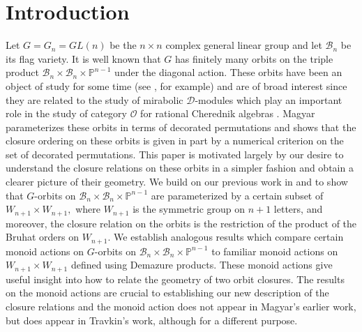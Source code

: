 \documentclass[12pt]{amsart}
\numberwithin{equation}{section}
\newcommand{\B}{\mathcal{B}}
\begin{document}
\section{Introduction}
Let $G=G_{n}=GL(n)$ be the $n\times n$ complex general linear group and let $\B_{n}$ be its flag variety.  It is well known that $G$ has finitely many orbits on the triple product 
$\B_{n}\times\B_{n}\times\mathbb{P}^{n-1}$ under the diagonal action.  These orbits have been an object of study for some time (see \cite{Magyar}, \cite{Travkin} for example) and are of broad interest since they are related to the study of mirabolic $\mathcal{D}$-modules which play an important role in the study of category $\mathcal{O}$ for rational Cherednik algebras \cite{FG}.  Magyar parameterizes these orbits in terms of decorated permutations and shows that the closure ordering on these orbits is given  in part by a numerical criterion on the set of decorated permutations.  This paper is motivated largely by our desire to understand the closure relations on these orbits in a simpler fashion and obtain a clearer picture of their geometry.  We build on our previous work in \cite{Shpairs} and \cite{Siorbits} to show that $G$-orbits on $\B_{n}\times\B_{n}\times \mathbb{P}^{n-1}$ are parameterized by a certain subset of $W_{n+1} \times W_{n+1},$ where $W_{n+1}$ is the symmetric group on $n+1$ letters, and moreover, the closure  relation on the orbits is the restriction of the product of the Bruhat orders on $W_{n+1}.$   We establish analogous results which compare certain monoid actions on $G$-orbits on $\B_{n}\times\B_{n}\times\mathbb{P}^{n-1}$ to familiar monoid actions on $W_{n+1} \times W_{n+1}$ defined using Demazure products.  These monoid actions give useful insight into how to relate the geometry of two orbit closures.  The results on the monoid actions are crucial to establishing our new description of the closure relations and the monoid action does not appear in Magyar's earlier work, but does appear in Travkin's work, although for a different purpose.



\end{document}
